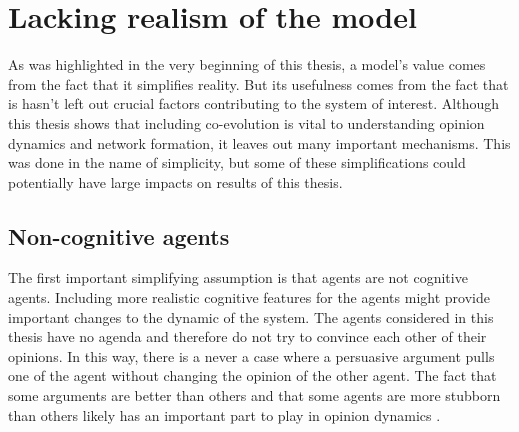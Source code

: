 \documentclass[11pt]{article}
\begin{document}
\section{Lacking realism of the model}
As was highlighted in the very beginning of this thesis, a model's value comes from the fact that it simplifies reality. But its usefulness comes from the fact that is hasn't left out crucial factors contributing to the system of interest. Although this thesis shows that including co-evolution is vital to understanding opinion dynamics and network formation, it leaves out many important mechanisms. This was done in the name of simplicity, but some of these simplifications could potentially have large impacts on results of this thesis. 

\subsection{Non-cognitive agents}
The first important simplifying assumption is that agents are not cognitive agents. Including more realistic cognitive features for the agents might provide important changes to the dynamic of the system. The agents considered in this thesis have no agenda and therefore do not try to convince each other of their opinions. In this way, there is a never a case where a persuasive argument pulls one of the agent without changing the opinion of the other agent. The fact that some arguments are better than others and that some agents are more stubborn than others likely has an important part to play in opinion dynamics \cite{flache_models_2017,ghaderi_opinion_2014,yildiz_binary_2013}.
\end{document}
